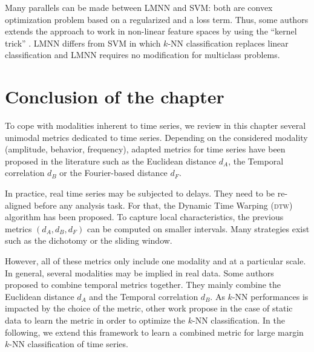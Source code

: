 Many parallels can be made between LMNN and SVM: both are convex optimization problem based on a regularized and a loss term. Thus, some authors extends the approach to work in non-linear feature spaces by using the “kernel trick” . LMNN differs from SVM in which $k$-NN classification replaces linear classification and LMNN requires no modification for multiclass problems.





\section{Conclusion of the chapter}
To cope with modalities inherent to time series, we review in this chapter several unimodal metrics dedicated to time series. Depending on the considered modality (amplitude, behavior, frequency), adapted metrics for time series have been proposed in the literature such as the Euclidean distance $d_A$, the Temporal correlation $d_B$ or the Fourier-based distance $d_F$.

In practice, real time series may be subjected to delays. They need to be re-aligned before any analysis task. For that, the Dynamic Time Warping (\textsc{dtw}) algorithm has been proposed. To capture local characteristics, the previous metrics $(d_A, d_B, d_F)$ can be computed on smaller intervals. Many strategies exist such as the dichotomy or the sliding window.

However, all of these metrics only include one modality and at a particular scale. In general, several modalities may be implied in real data. Some authors proposed to combine temporal metrics together. They mainly combine the Euclidean distance $d_A$ and the Temporal correlation $d_B$. As $k$-NN performances is impacted by the choice of the metric, other work propose in the case of static data to learn the metric in order to optimize the $k$-NN classification. In the following, we extend this framework to learn a combined metric for large margin $k$-NN classification of time series.







